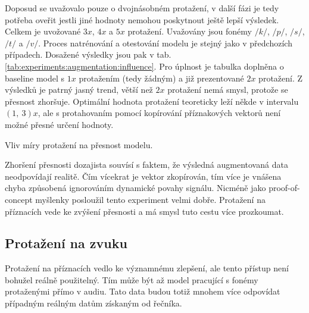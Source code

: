 Doposud se uvažovalo pouze o dvojnásobném protažení, v další fázi je tedy potřeba oveřit jestli jiné hodnoty nemohou poskytnout ještě lepší výsledek. Celkem je uvožované $3x$, $4x$ a $5x$ protažení. Uvažovány jsou fonémy $/k/$, $/p/$, $/s/$, $/t/$ a $/v/$. Proces natrénování a otestování modelu je stejný jako v předchozích případech. Dosažené výsledky jsou pak v tab. \ref{tab:experiments:augmentation:influence}. Pro úplnost je tabulka doplněna o baseline model s $1x$ protažením (tedy žádným) a již prezentované $2x$ protažení. Z výsledků je patrný jasný trend, větší než $2x$ protažení nemá smysl, protože se přesnost zhoršuje. Optimální hodnota protažení teoreticky leží někde v intervalu $\left(1,\ 3\right)x$, ale s protahovaním pomocí kopírování příznakových vektorů není možné přesné určení hodnoty.

\begin{table}[htpb]
  \centering
  \def\arraystretch{1.5}
  \caption{Vliv míry protažení na přesnost modelu.}
  \label{tab:experiments:augmentation:influence}
\end{table}

Zhoršení přesnosti dozajista souvísí s faktem, že výsledná augmentovaná data neodpovídají realitě. Čím vícekrat je vektor zkopírován, tím více je vnášena chyba způsobená ignorováním dynamické povahy signálu. Nicméně jako proof-of-concept myšlenky posloužil tento experiment velmi dobře. Protažení na příznacích vede ke zvýšení přesnosti a má smysl tuto cestu více prozkoumat.

\subsection{Protažení na zvuku}
\label{chap:experiments:augmentation:audio}

Protažení na příznacích vedlo ke významnému zlepšení, ale tento přístup není bohužel reálně použitelný. Tím může být až model pracující s fonémy protaženými přímo v audiu. Tato data budou totiž mnohem více odpovídat případným reálným datům získaným od řečníka.

